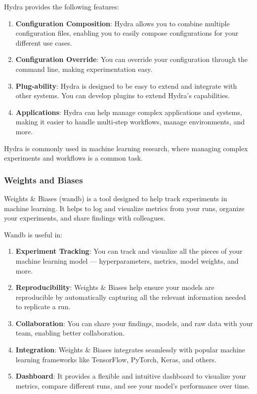 Hydra provides the following features:
\begin{enumerate}
    \item \textbf{Configuration Composition}: Hydra allows you to combine multiple configuration files, enabling you to easily compose configurations for your different use cases.
    \item \textbf{Configuration Override}: You can override your configuration through the command line, making experimentation easy.
    \item \textbf{Plug-ability}: Hydra is designed to be easy to extend and integrate with other systems. You can develop plugins to extend Hydra's capabilities.
    \item \textbf{Applications}: Hydra can help manage complex applications and systems, making it easier to handle multi-step workflows, manage environments, and more.
\end{enumerate}
Hydra is commonly used in machine learning research, where managing complex experiments and workflows is a common task.

\subsubsection{Weights and Biases}
Weights \& Biases (wandb) is a tool designed to help track experiments in machine learning. It helps to log and visualize metrics from your runs, organize your experiments, and share findings with colleagues.

Wandb is useful in:
\begin{enumerate}
    \item \textbf{Experiment Tracking}: You can track and visualize all the pieces of your machine learning model — hyperparameters, metrics, model weights, and more.
    \item \textbf{Reproducibility}: Weights \& Biases help ensure your models are reproducible by automatically capturing all the relevant information needed to replicate a run.
    \item \textbf{Collaboration}: You can share your findings, models, and raw data with your team, enabling better collaboration.
    \item \textbf{Integration}: Weights \& Biases integrates seamlessly with popular machine learning frameworks like TensorFlow, PyTorch, Keras, and others.
    \item \textbf{Dashboard}: It provides a flexible and intuitive dashboard to visualize your metrics, compare different runs, and see your model's performance over time.
\end{enumerate}

